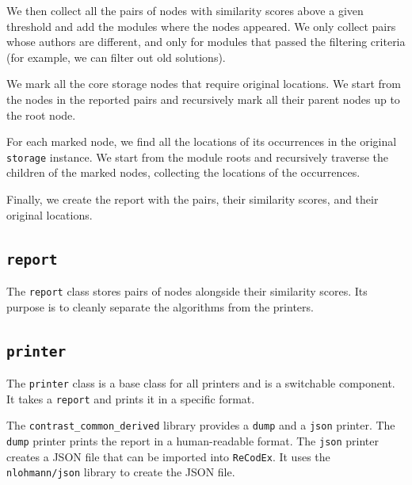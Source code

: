 We then collect all the pairs of nodes with similarity scores above a given threshold and add the modules where the nodes appeared.
We only collect pairs whose authors are different, and only for modules that passed the filtering criteria (for example, we can filter out old solutions).

We mark all the core storage nodes that require original locations.
We start from the nodes in the reported pairs and recursively mark all their parent nodes up to the root node.

For each marked node, we find all the locations of its occurrences in the original \texttt{storage} instance.
We start from the module roots and recursively traverse the children of the marked nodes, collecting the locations of the occurrences.

Finally, we create the report with the pairs, their similarity scores, and their original locations.

\subsection{\texttt{report}}

The \texttt{report} class stores pairs of nodes alongside their similarity scores.
Its purpose is to cleanly separate the algorithms from the printers.

\subsection{\texttt{printer}}

The \texttt{printer} class is a base class for all printers and is a switchable component.
It takes a \texttt{report} and prints it in a specific format.

The \texttt{contrast\_common\_derived} library provides a \texttt{dump} and a \texttt{json} printer.
The \texttt{dump} printer prints the report in a human-readable format.
The \texttt{json} printer creates a JSON file that can be imported into \texttt{ReCodEx}.
It uses the \texttt{nlohmann/json} library \cite{json} to create the JSON file.
